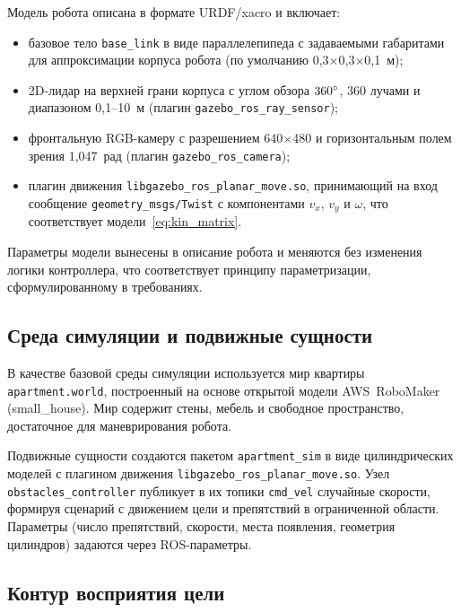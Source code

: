 Модель робота описана в формате URDF/xacro и включает:
\begin{itemize}
    \item базовое тело \texttt{base\_link} в виде
          параллелепипеда с задаваемыми габаритами для аппроксимации корпуса робота (по умолчанию
          0{,}3$\times$0{,}3$\times$0{,}1~м);
    \item 2D-лидар на верхней грани корпуса с углом обзора $360\degree{}$,
          360 лучами и диапазоном 0{,}1--10~м (плагин
          \texttt{gazebo\_ros\_ray\_sensor});
    \item фронтальную RGB-камеру с разрешением
          640$\times$480 и горизонтальным полем зрения 1{,}047~рад
          (плагин \texttt{gazebo\_ros\_camera});
    \item плагин движения \texttt{libgazebo\_ros\_planar\_move.so},
          принимающий на вход сообщение \texttt{geometry\_msgs/Twist} с
          компонентами $v_x$, $v_y$ и $\omega$, что соответствует
          модели~\eqref{eq:kin_matrix}.
\end{itemize}

Параметры модели вынесены в описание робота и меняются без изменения
логики контроллера, что соответствует принципу параметризации,
сформулированному в требованиях.

\subsection{Среда симуляции и подвижные сущности}

В качестве базовой среды симуляции используется мир квартиры
\texttt{apartment.world}, построенный на основе открытой модели
AWS~RoboMaker (small\_house). Мир содержит стены, мебель и свободное
пространство, достаточное для маневрирования робота.

Подвижные сущности создаются пакетом \texttt{apartment\_sim} в виде
цилиндрических моделей с плагином движения
\texttt{libgazebo\_ros\_planar\_move.so}. Узел
\texttt{obstacles\_controller} публикует в их топики \texttt{cmd\_vel}
случайные скорости, формируя сценарий с движением цели и
препятствий в ограниченной области. Параметры (число препятствий,
скорости, места появления, геометрия цилиндров) задаются через
ROS-параметры.


\subsection{Контур восприятия цели}

